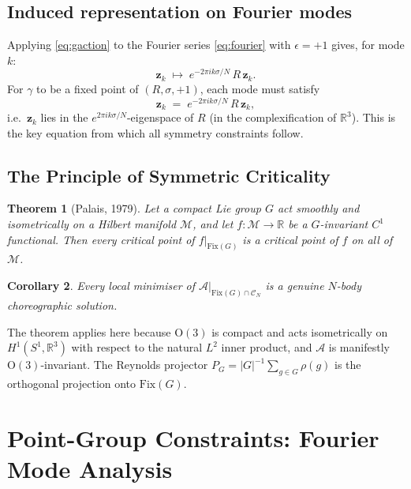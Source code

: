 \documentclass[12pt, a4paper]{article}
\theoremstyle{plain}
\newtheorem{theorem}{Theorem}[section]
\newtheorem{corollary}[theorem]{Corollary}
\theoremstyle{definition}
\newcommand{\R}{\mathbb{R}}
\newcommand{\Action}{\mathcal{A}}
\newcommand{\Fix}{\mathrm{Fix}}
\newcommand{\bfz}{\mathbf{z}}
\newcommand{\On}{\mathrm{O}}
\begin{document}
\subsection{Induced representation on Fourier modes}

Applying \eqref{eq:gaction} to the Fourier series \eqref{eq:fourier}
with $\epsilon = +1$ gives, for mode $k$:
\begin{equation}\label{eq:modeaction}
  \bfz_k \;\longmapsto\; e^{-2\pi ik\sigma/N}\,R\,\bfz_k.
\end{equation}
For $\gamma$ to be a fixed point of $(R,\sigma,+1)$, each mode must
satisfy
\begin{equation}\label{eq:fixcond}
  \bfz_k \;=\; e^{-2\pi ik\sigma/N}\,R\,\bfz_k,
\end{equation}
i.e.\ $\bfz_k$ lies in the $e^{2\pi ik\sigma/N}$-eigenspace of $R$
(in the complexification of $\R^3$).  This is the key equation from
which all symmetry constraints follow.

\subsection{The Principle of Symmetric Criticality}

\begin{theorem}[Palais, 1979]\label{thm:psc}
Let a compact Lie group $G$ act smoothly and isometrically on a
Hilbert manifold $\mathcal{M}$, and let $f : \mathcal{M} \to \R$ be a
$G$-invariant $C^1$ functional.  Then every critical point of
$f|_{\Fix(G)}$ is a critical point of $f$ on all of $\mathcal{M}$.
\end{theorem}

\begin{corollary}
Every local minimiser of $\Action|_{\Fix(G) \cap \mathcal{C}_N}$
is a genuine $N$-body choreographic solution.
\end{corollary}

The theorem applies here because $\On(3)$ is compact and acts
isometrically on $H^1(S^1,\R^3)$ with respect to the natural $L^2$
inner product, and $\Action$ is manifestly $\On(3)$-invariant.  The
Reynolds projector $P_G = |G|^{-1}\sum_{g\in G}\rho(g)$ is the
orthogonal projection onto $\Fix(G)$.

\section{Point-Group Constraints: Fourier Mode Analysis}
\end{document}

